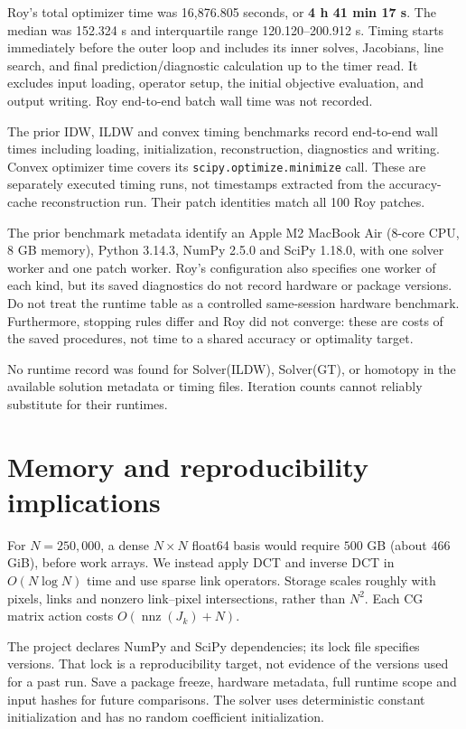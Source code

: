 \documentclass[11pt,a4paper]{article}
\begin{document}
Roy's total optimizer time was 16,876.805 seconds, or \textbf{4 h 41 min 17 s}. The median was 152.324 s and interquartile range 120.120--200.912 s. Timing starts immediately before the outer loop and includes its inner solves, Jacobians, line search, and final prediction/diagnostic calculation up to the timer read. It excludes input loading, operator setup, the initial objective evaluation, and output writing. Roy end-to-end batch wall time was not recorded.

The prior IDW, ILDW and convex timing benchmarks record end-to-end wall times including loading, initialization, reconstruction, diagnostics and writing. Convex optimizer time covers its \texttt{scipy.optimize.minimize} call. These are separately executed timing runs, not timestamps extracted from the accuracy-cache reconstruction run. Their patch identities match all 100 Roy patches.

The prior benchmark metadata identify an Apple M2 MacBook Air (8-core CPU, 8 GB memory), Python 3.14.3, NumPy 2.5.0 and SciPy 1.18.0, with one solver worker and one patch worker. Roy's configuration also specifies one worker of each kind, but its saved diagnostics do not record hardware or package versions. Do not treat the runtime table as a controlled same-session hardware benchmark. Furthermore, stopping rules differ and Roy did not converge: these are costs of the saved procedures, not time to a shared accuracy or optimality target.

No runtime record was found for Solver(ILDW), Solver(GT), or homotopy in the available solution metadata or timing files. Iteration counts cannot reliably substitute for their runtimes.
\clearpage
\section{Memory and reproducibility implications}
For $N=250{,}000$, a dense $N\times N$ float64 basis would require $500$ GB (about $466$ GiB), before work arrays. We instead apply DCT and inverse DCT in $O(N\log N)$ time and use sparse link operators. Storage scales roughly with pixels, links and nonzero link--pixel intersections, rather than $N^2$. Each CG matrix action costs $O(\operatorname{nnz}(J_k)+N)$.

The project declares NumPy and SciPy dependencies; its lock file specifies versions. That lock is a reproducibility target, not evidence of the versions used for a past run. Save a package freeze, hardware metadata, full runtime scope and input hashes for future comparisons. The solver uses deterministic constant initialization and has no random coefficient initialization.
\clearpage
\end{document}

